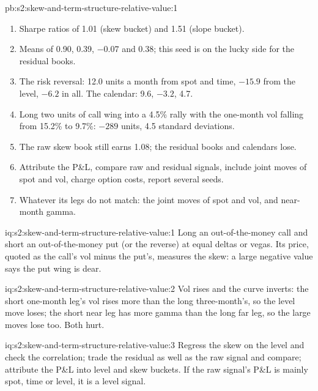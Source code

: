 \begin{solution}{pb:s2:skew-and-term-structure-relative-value:1}
\begin{enumerate}
average over eight). Only 16\% and 51\% of their P\&L comes from the planted skew and slope; the raw skew book earns 1.13 with 9\%, and the raw
calendar's P\&L is 160\% level.
\item Sharpe ratios of 1.01 (skew bucket) and 1.51 (slope bucket).
\item Means of 0.90, 0.39, $-0.07$ and 0.38; this seed is on the lucky side for the residual books.
\item The risk reversal: 12.0 units a month from spot and time, $-15.9$ from the level, $-6.2$ in all. The calendar: 9.6, $-3.2$, 4.7.
\item Long two units of call wing into a 4.5\% rally with the one-month vol falling from 15.2\% to 9.7\%: $-289$ units, 4.5 standard deviations.
\item The raw skew book still earns 1.08; the residual books and calendars lose.
\item Attribute the P\&L, compare raw and residual signals, include joint moves of spot and vol, charge option costs, report several seeds.
\item Whatever its legs do not match: the joint moves of spot and vol, and near-month gamma.
\end{enumerate}
\end{solution}

\begin{solution}{iq:s2:skew-and-term-structure-relative-value:1}
Long an out-of-the-money call and short an out-of-the-money put (or the reverse) at equal deltas or vegas. Its price, quoted as the call's vol minus
the put's, measures the skew: a large negative value says the put wing is dear.
\end{solution}

\begin{solution}{iq:s2:skew-and-term-structure-relative-value:2}
Vol rises and the curve inverts: the short one-month leg's vol rises more than the long three-month's, so the level move loses; the short near leg has
more gamma than the long far leg, so the large moves lose too. Both hurt.
\end{solution}

\begin{solution}{iq:s2:skew-and-term-structure-relative-value:3}
Regress the skew on the level and check the correlation; trade the residual as well as the raw signal and compare; attribute the P\&L into level and
skew buckets. If the raw signal's P\&L is mainly spot, time or level, it is a level signal.
\end{solution}

